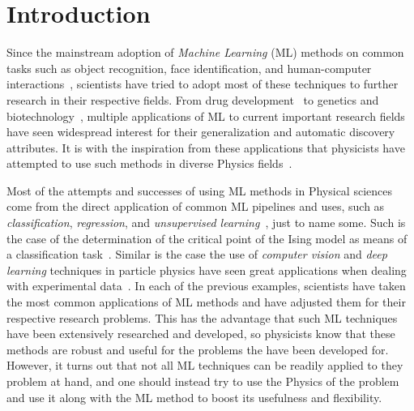 \chapter{Introduction}
\label{Cap1}

Since the mainstream adoption of \emph{Machine Learning} (ML) methods
on common tasks such as object recognition, face identification,
and human-computer interactions~\cite{lecunDeepLearning2015},
scientists have tried to adopt most of these techniques to further research
in their respective fields. From drug development~\cite{redaMachineLearningApplications2020}
to genetics and biotechnology~\cite{libbrechtMachineLearningApplications2015},
multiple applications of ML to current important research fields have seen
widespread interest for their generalization and automatic discovery attributes.
It is with the inspiration from these applications that physicists have attempted to use 
such methods in diverse Physics fields~\cite{carleoMachineLearningPhysical2019a,dunjkoMachineLearningArtificial2018,carrasquillaMachineLearningPhases2017a}.

Most of the attempts and successes of using ML methods in Physical sciences come from
the direct application of common ML pipelines and uses, such as \emph{classification},
\emph{regression}, and \emph{unsupervised learning}~\cite{hastieElementsStatisticalLearning2009}, just to name some.
Such is the case of the determination of the
critical point of the Ising model as means of a classification task~\cite{carrasquillaMachineLearningPhases2017a}.
Similar is the case the use of \emph{computer vision} and \emph{deep learning} techniques in
particle physics have seen great applications when dealing with experimental data~\cite{radovicMachineLearningEnergy2018}.
In each of the previous examples, scientists have taken the most common applications
of ML methods and have adjusted them for their respective research problems.
This has the advantage that such ML techniques have been extensively researched
and developed, so physicists know that these methods are robust and useful for
the problems the have been developed for.
However, it turns out that not all ML techniques can be readily applied to they problem
at hand, and one should instead try to use the Physics of the problem and use it along
with the ML method to boost its usefulness and flexibility.